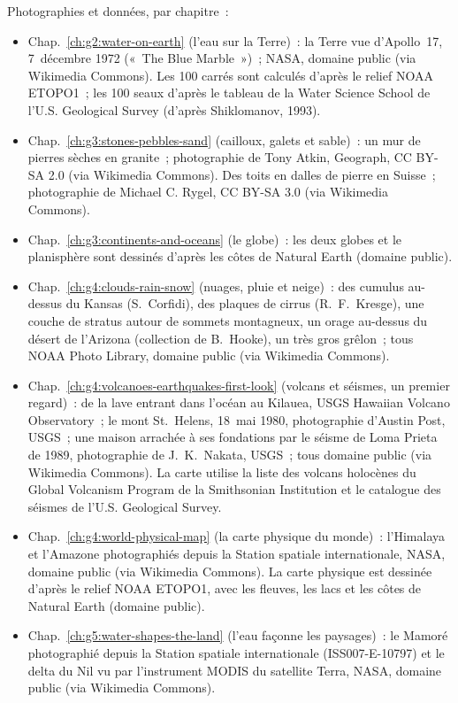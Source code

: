 \bigskip
\noindent Photographies et données, par chapitre~:
\begin{itemize}\small
  \item Chap.~\ref{ch:g2:water-on-earth} (l'eau sur la Terre)~: la Terre vue d'Apollo~17, 7~décembre 1972 («~The Blue Marble~»)~; NASA, domaine public (via Wikimedia Commons). Les 100 carrés sont calculés d'après le relief NOAA ETOPO1~; les 100 seaux d'après le tableau de la Water Science School de l'U.S. Geological Survey (d'après Shiklomanov, 1993).
  \item Chap.~\ref{ch:g3:stones-pebbles-sand} (cailloux, galets et sable)~: un mur de pierres sèches en granite~; photographie de Tony Atkin, Geograph, CC BY-SA 2.0 (via Wikimedia Commons). Des toits en dalles de pierre en Suisse~; photographie de Michael C. Rygel, CC BY-SA 3.0 (via Wikimedia Commons).
  \item Chap.~\ref{ch:g3:continents-and-oceans} (le globe)~: les deux globes et le planisphère sont dessinés d'après les côtes de Natural Earth (domaine public).
  \item Chap.~\ref{ch:g4:clouds-rain-snow} (nuages, pluie et neige)~: des cumulus au-dessus du Kansas (S.~Corfidi), des plaques de cirrus (R.~F.~Kresge), une couche de stratus autour de sommets montagneux, un orage au-dessus du désert de l'Arizona (collection de B.~Hooke), un très gros grêlon~; tous NOAA Photo Library, domaine public (via Wikimedia Commons).
  \item Chap.~\ref{ch:g4:volcanoes-earthquakes-first-look} (volcans et séismes, un premier regard)~: de la lave entrant dans l'océan au Kilauea, USGS Hawaiian Volcano Observatory~; le mont St.~Helens, 18~mai 1980, photographie d'Austin Post, USGS~; une maison arrachée à ses fondations par le séisme de Loma Prieta de 1989, photographie de J.~K.~Nakata, USGS~; tous domaine public (via Wikimedia Commons). La carte utilise la liste des volcans holocènes du Global Volcanism Program de la Smithsonian Institution et le catalogue des séismes de l'U.S. Geological Survey.
  \item Chap.~\ref{ch:g4:world-physical-map} (la carte physique du monde)~: l'Himalaya et l'Amazone photographiés depuis la Station spatiale internationale, NASA, domaine public (via Wikimedia Commons). La carte physique est dessinée d'après le relief NOAA ETOPO1, avec les fleuves, les lacs et les côtes de Natural Earth (domaine public).
  \item Chap.~\ref{ch:g5:water-shapes-the-land} (l'eau façonne les paysages)~: le Mamoré photographié depuis la Station spatiale internationale (ISS007-E-10797) et le delta du Nil vu par l'instrument MODIS du satellite Terra, NASA, domaine public (via Wikimedia Commons).

\end{itemize}
